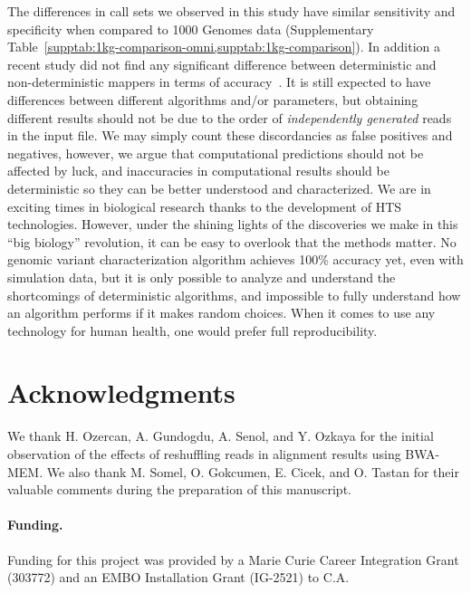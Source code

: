 \documentclass{bioinfo}
\begin{document}
The differences in call sets we observed in this study 
have similar sensitivity and specificity when compared to 1000 Genomes data (Supplementary Table~\ref{supptab:1kg-comparison-omni,supptab:1kg-comparison}). In addition a recent study did not find any significant difference between deterministic and non-deterministic mappers in terms of accuracy~\citep{Cornish2015}.
It is still expected to 
have differences between different algorithms and/or parameters, but
obtaining different results should not be due to the order of {\it independently generated} reads in the input file. 
We may simply count these discordancies as false positives and negatives, however, 
we argue that computational predictions should not be affected by luck, and inaccuracies in computational results should be deterministic so they can be better understood and characterized.
We are in exciting times in biological research thanks to the development of HTS technologies. However, under the shining lights of the discoveries we make in this ``big biology'' revolution,  
it can be easy to overlook that the methods matter.
No genomic variant characterization algorithm achieves 100\% accuracy yet, even with  simulation data, but it is only possible to analyze and understand the shortcomings of 
deterministic algorithms, and impossible to fully understand how an algorithm performs if it makes random choices. 
When it comes to use any technology for human health, one would prefer full reproducibility. 

\vspace*{-0.75cm}

\section*{Acknowledgments}

We thank H. Ozercan, A. Gundogdu, A. Senol, and Y. Ozkaya for the initial observation of the effects of reshuffling reads in alignment results using BWA-MEM. We also thank M. Somel, 
O. Gokcumen, E. Cicek, and O. Tastan for
their valuable comments during the preparation of this manuscript.

\paragraph{Funding.}
Funding for this project was provided by a Marie Curie Career Integration Grant (303772) and an 
EMBO Installation Grant (IG-2521) to C.A.

\vspace*{-0.75cm}

\footnotesize




\clearpage


\end{document}

